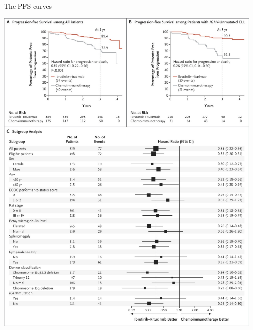 \documentclass[ignorenonframetext,]{beamer}
\begin{document}
\begin{frame}{The PFS curves}
\protect\hypertarget{the-pfs-curves}{}

\centering

\includegraphics{../figures/shanafelt_curves.pdf}

\end{frame}
\end{document}
